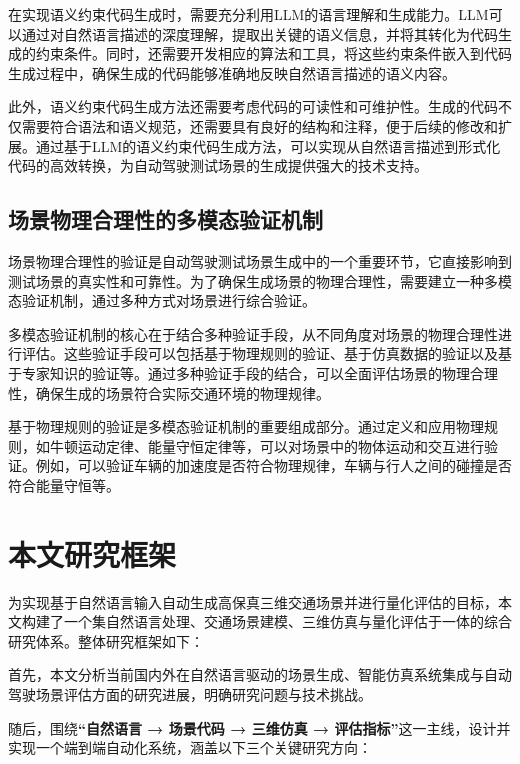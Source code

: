 	在实现语义约束代码生成时，需要充分利用LLM的语言理解和生成能力。LLM可以通过对自然语言描述的深度理解，提取出关键的语义信息，并将其转化为代码生成的约束条件。同时，还需要开发相应的算法和工具，将这些约束条件嵌入到代码生成过程中，确保生成的代码能够准确地反映自然语言描述的语义内容。
	
	此外，语义约束代码生成方法还需要考虑代码的可读性和可维护性。生成的代码不仅需要符合语法和语义规范，还需要具有良好的结构和注释，便于后续的修改和扩展。通过基于LLM的语义约束代码生成方法，可以实现从自然语言描述到形式化代码的高效转换，为自动驾驶测试场景的生成提供强大的技术支持。
	
	\subsection{场景物理合理性的多模态验证机制}
	场景物理合理性的验证是自动驾驶测试场景生成中的一个重要环节，它直接影响到测试场景的真实性和可靠性。为了确保生成场景的物理合理性，需要建立一种多模态验证机制，通过多种方式对场景进行综合验证。
	
	多模态验证机制的核心在于结合多种验证手段，从不同角度对场景的物理合理性进行评估。这些验证手段可以包括基于物理规则的验证、基于仿真数据的验证以及基于专家知识的验证等。通过多种验证手段的结合，可以全面评估场景的物理合理性，确保生成的场景符合实际交通环境的物理规律。
	
	基于物理规则的验证是多模态验证机制的重要组成部分。通过定义和应用物理规则，如牛顿运动定律、能量守恒定律等，可以对场景中的物体运动和交互进行验证。例如，可以验证车辆的加速度是否符合物理规律，车辆与行人之间的碰撞是否符合能量守恒等。

\section{本文研究框架}

为实现基于自然语言输入自动生成高保真三维交通场景并进行量化评估的目标，本文构建了一个集自然语言处理、交通场景建模、三维仿真与量化评估于一体的综合研究体系。整体研究框架如下：

首先，本文分析当前国内外在自然语言驱动的场景生成、智能仿真系统集成与自动驾驶场景评估方面的研究进展，明确研究问题与技术挑战。

随后，围绕\textbf{“自然语言 → 场景代码 → 三维仿真 → 评估指标”}这一主线，设计并实现一个端到端自动化系统，涵盖以下三个关键研究方向：


